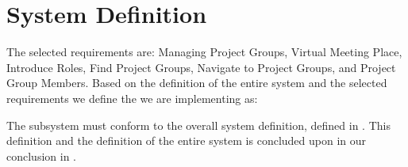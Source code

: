 \section{System Definition}
\label{sec:subSysDef}
The selected requirements are: Managing Project Groups, Virtual Meeting Place, Introduce Roles, Find Project Groups, Navigate to Project Groups, and Project Group Members. 
Based on the definition of the entire system and the selected requirements we define the \subsystem{} we are implementing as: 

The subsystem must conform to the overall system definition, defined in .
This definition and the definition of the entire system is concluded upon in our conclusion in .
